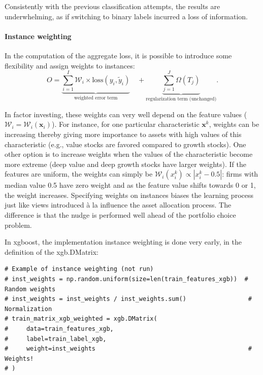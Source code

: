 Consistently with the previous classification attempts, the results are underwhelming, as if switching to binary labels incurred a loss of information.

\paragraph{Instance weighting}\label{instweight}

In the computation of the aggregate loss, it is possible to introduce some flexibility and assign weights to instances:
\begin{equation}
O=\underbrace{\sum_{i=1}^I\mathcal{W}_i \times \text{loss}(y_i,\tilde{y}_i)}_{\text{weighted error term}} \quad + \underbrace{\sum_{j=1}^J\Omega(T_j)}_{\text{regularization term (unchanged)}}.
\end{equation}

In factor investing, these weights can very well depend on the feature values ($\mathcal{W}_i=\mathcal{W}_i(\textbf{x}_i)$). For instance, for one particular characteristic $\textbf{x}^k$, weights can be increasing thereby giving more importance to assets with high values of this characteristic (e.g., value stocks  are favored compared to growth stocks). One other option is to increase weights when the values of the characteristic become more extreme (deep value and deep growth stocks have larger weights). If the features are uniform, the weights can simply be $\mathcal{W}_i(x_i^k)\propto|x_i^k -0.5|$: firms with median value 0.5 have zero weight and as the feature value shifts towards 0 or 1, the weight increases. Specifying weights on instances biases the learning process just like views introduced à la \cite{black1992global} influence the asset allocation process. The difference is that the nudge is performed well ahead of the portfolio choice problem.

In xgboost, the implementation instance weighting is done very early, in the definition of the xgb.DMatrix:

\begin{verbatim}
# Example of instance weighting (not run)
# inst_weights = np.random.uniform(size=len(train_features_xgb))  # Random weights
# inst_weights = inst_weights / inst_weights.sum()                 # Normalization
# train_matrix_xgb_weighted = xgb.DMatrix(
#     data=train_features_xgb,
#     label=train_label_xgb,
#     weight=inst_weights                                          # Weights!
# )
\end{verbatim}

